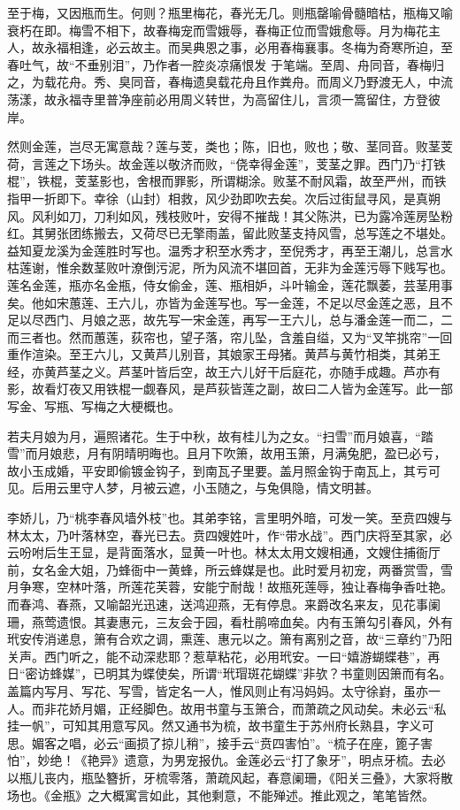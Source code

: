 \begin{showcontents}{}
{至于梅，又因瓶而生。何则？瓶里梅花，春光无几。则瓶罄喻骨髓暗枯，瓶梅又喻衰朽在即。梅雪不相下，故春梅宠而雪娥辱，春梅正位而雪娥愈辱。月为梅花主人，故永福相逢，必云故主。而吴典恩之事，必用春梅襄事。冬梅为奇寒所迫，至春吐气，故“不垂别泪”，乃作者一腔炎凉痛恨发
于笔端。至周、舟同音，春梅归之，为载花舟。秀、臭同音，春梅遗臭载花舟且作粪舟。而周义乃野渡无人，中流荡漾，故永福寺里普净座前必用周义转世，为高留住儿，言须一篙留住，方登彼岸。

然则金莲，岂尽无寓意哉？莲与芰，类也；陈，旧也，败也；敬、茎同音。败茎芰荷，言莲之下场头。故金莲以敬济而败，“侥幸得金莲”，芰茎之罪。西门乃“打铁棍”，铁棍，芰茎影也，舍根而罪影，所谓糊涂。败茎不耐风霜，故至严州，而铁指甲一折即下。幸徐（山封）相救，风少劲即吹去矣。次后过街鼠寻风，是真朔风。风利如刀，刀利如风，残枝败叶，安得不摧哉！其父陈洪，已为露冷莲房坠粉红。其舅张团练搬去，又荷尽已无擎雨盖，留此败茎支持风雪，总写莲之不堪处。益知夏龙溪为金莲胜时写也。温秀才积至水秀才，至倪秀才，再至王潮儿，总言水枯莲谢，惟余数茎败叶潦倒污泥，所为风流不堪回首，无非为金莲污辱下贱写也。莲名金莲，瓶亦名金瓶，侍女偷金，莲、瓶相妒，斗叶输金，莲花飘萎，芸茎用事矣。他如宋蕙莲、王六儿，亦皆为金莲写也。写一金莲，不足以尽金莲之恶，且不足以尽西门、月娘之恶，故先写一宋金莲，再写一王六儿，总与潘金莲一而二，二而三者也。然而蕙莲，荻帘也，望子落，帘儿坠，含羞自缢，又为“叉竿挑帘”一回重作渲染。至王六儿，又黄芦儿别音，其娘家王母猪。黄芦与黄竹相类，其弟王经，亦黄芦茎之义。芦茎叶皆后空，故王六儿好干后庭花，亦随手成趣。芦亦有影，故看灯夜又用铁棍一觑春风，是芦荻皆莲之副，故曰二人皆为金莲写。此一部写金、写瓶、写梅之大梗概也。

若夫月娘为月，遍照诸花。生于中秋，故有桂儿为之女。“扫雪”而月娘喜，“踏雪”而月娘悲，月有阴晴明晦也。且月下吹箫，故用玉箫，月满兔肥，盈已必亏，故小玉成婚，平安即偷镀金钩子，到南瓦子里要。盖月照金钩于南瓦上，其亏可见。后用云里守人梦，月被云遮，小玉随之，与兔俱隐，情文明甚。

李娇儿，乃“桃李春风墙外枝”也。其弟李铭，言里明外暗，可发一笑。至贲四嫂与林太太，乃叶落林空，春光已去。贲四嫂姓叶，作“带水战”。西门庆将至其家，必云吩咐后生王显，是背面落水，显黄一叶也。林太太用文嫂相通，文嫂住捕衙厅前，女名金大姐，乃蜂衙中一黄蜂，所云蜂媒是也。此时爱月初宠，两番赏雪，雪月争寒，空林叶落，所莲花芙蓉，安能宁耐哉！故瓶死莲辱，独让春梅争香吐艳。而春鸿、春燕，又喻韶光迅速，送鸿迎燕，无有停息。来爵改名来友，见花事阑珊，燕莺遗恨。其妻惠元，三友会于园，看杜鹃啼血矣。内有玉箫勾引春风，外有玳安传消递息，箫有合欢之调，熏莲、惠元以之。箫有离别之音，故“三章约”乃阳关声。西门听之，能不动深悲耶？惹草粘花，必用玳安。一曰“嬉游蝴蝶巷”，再日“密访蜂媒”，已明其为蝶使矣，所谓“玳瑁斑花蝴蝶”非欤？书童则因箫而有名。盖篇内写月、写花、写雪，皆定名一人，惟风则止有冯妈妈。太守徐崶，虽亦一人。而非花娇月媚，正经脚色。故用书童与玉箫合，而萧疏之风动矣。未必云“私挂一帆”，可知其用意写风。然又通书为梳，故书童生于苏州府长熟县，字义可思。媚客之唱，必云“画损了掠儿稍”，接手云“贲四害怕”。“梳子在座，篦子害怕”，妙绝！《艳异》遗意，为男宠报仇。金莲必云“打了象牙”，明点牙梳。去必以瓶儿丧内，瓶坠簪折，牙梳零落，萧疏风起，春意阑珊，《阳关三叠》，大家将散场也。《金瓶》之大概寓言如此，其他剩意，不能殚述。推此观之，笔笔皆然。

}
\end{showcontents}
